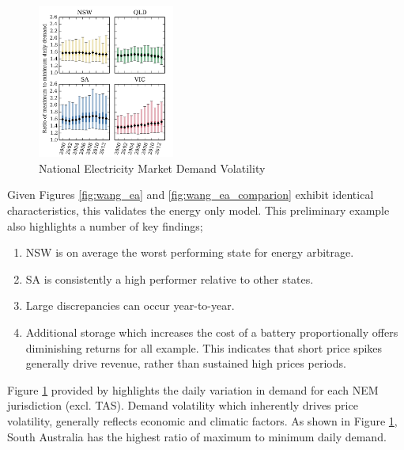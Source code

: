 \begin{figure}
    \begin{center}
        \includegraphics[width=0.4\textwidth]{Pictures/Chapter3/energy_vol.png}
    \end{center}
    
    \caption{National Electricity Market Demand Volatility \parencite{McConnell}}
    \label{fig:demand_volatility}
\end{figure}
Given Figures \ref{fig:wang_ea} and \ref{fig:wang_ea_comparion} exhibit identical characteristics, this validates the energy only model. This preliminary example also highlights a number of key findings;
\begin{enumerate}
    \item NSW is on average the worst performing state for energy arbitrage.
    \item SA is consistently a high performer relative to other states.
    \item Large discrepancies can occur year-to-year.
    \item Additional storage which increases the cost of a battery proportionally offers diminishing returns for all example. This indicates that short price spikes generally drive revenue, rather than sustained high prices periods. 
\end{enumerate}
Figure \ref{fig:demand_volatility} provided by \textcite{McConnell} highlights the daily variation in demand for each NEM jurisdiction (excl. TAS). Demand volatility which inherently drives price volatility, generally reflects economic and climatic factors. As shown in Figure \ref{fig:demand_volatility}, South Australia has the highest ratio of maximum to minimum daily demand.  
